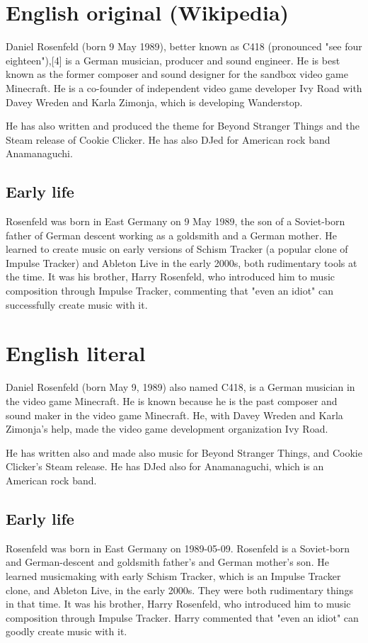 \section{English original (Wikipedia)}
Daniel Rosenfeld (born 9 May 1989), better known as C418 (pronounced "see four eighteen"),[4] is a German musician, producer and sound engineer.
He is best known as the former composer and sound designer for the sandbox video game Minecraft.
He is a co-founder of independent video game developer Ivy Road with Davey Wreden and Karla Zimonja, which is developing Wanderstop. 

He has also written and produced the theme for Beyond Stranger Things and the Steam release of Cookie Clicker.
He has also DJed for American rock band Anamanaguchi. 

\subsection{Early life}
Rosenfeld was born in East Germany on 9 May 1989, the son of a Soviet-born father of German descent working as a goldsmith and a German mother.
He learned to create music on early versions of Schism Tracker (a popular clone of Impulse Tracker) and Ableton Live in the early 2000s, both rudimentary tools at the time.
It was his brother, Harry Rosenfeld, who introduced him to music composition through Impulse Tracker, commenting that "even an idiot" can successfully create music with it.

\section{English literal}
Daniel Rosenfeld (born May 9, 1989) also named C418, is a German musician in the video game Minecraft.
He is known because he is the past composer and sound maker in the video game Minecraft.
He, with Davey Wreden and Karla Zimonja's help, made the video game development organization Ivy Road.

He has written also and made also music for Beyond Stranger Things, and Cookie Clicker's Steam release.
He has DJed also for Anamanaguchi, which is an American rock band.

\subsection{Early life}
Rosenfeld was born in East Germany on 1989-05-09.
Rosenfeld is a Soviet-born and German-descent and goldsmith father's and German mother's son.
He learned musicmaking with early Schism Tracker, which is an Impulse Tracker clone, and Ableton Live, in the early 2000s.
They were both rudimentary things in that time.
It was his brother, Harry Rosenfeld, who introduced him to music composition through Impulse Tracker.
Harry commented that "even an idiot" can goodly create music with it.
